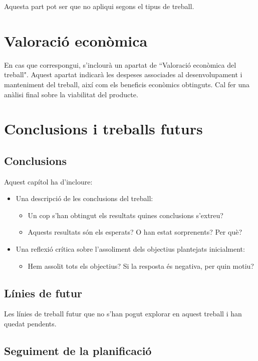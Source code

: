 \documentclass[CAT,BIB]{TFUOC}%
\begin{document}
Aquesta part pot ser que no apliqui segons el tipus de treball.

\chapter{Valoració econòmica}
En cas que correspongui, s'inclourà un apartat de ``Valoració econòmica del treball". Aquest apartat indicarà les despeses associades al desenvolupament i manteniment del treball, així com els beneficis econòmics obtinguts. Cal fer una anàlisi final sobre la viabilitat del producte.

\chapter{Conclusions i treballs futurs}

\section{Conclusions}
Aquest capítol ha d'incloure:
\begin{itemize}
\item Una descripció de les conclusions del treball:
\begin{itemize}
    \item Un cop s’han obtingut els resultats quines conclusions s’extreu?
    \item Aquests resultats són els esperats? O han estat sorprenents? Per què?
\end{itemize}
\item Una reflexió crítica sobre l’assoliment dels objectius plantejats inicialment:
\begin{itemize}
    \item Hem assolit tots els objectius? Si la resposta és negativa, per quin motiu?
\end{itemize}
\end{itemize}


\section{Línies de futur}
Les línies de treball futur que no s'han pogut explorar en aquest treball i han quedat pendents.

\section{Seguiment de la planificació}
\end{document}
